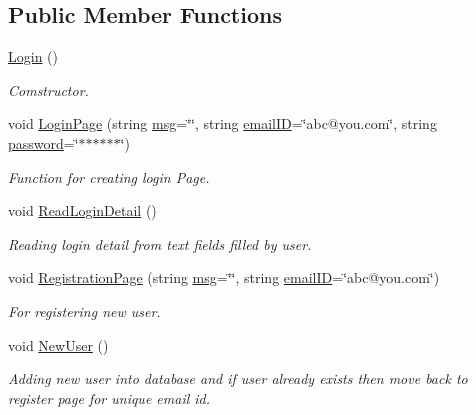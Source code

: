 \subsection*{Public Member Functions}
\begin{DoxyCompactItemize}
\item 
\hyperlink{classLogin_a4847f3e07e43b540d3339392346f87ff}{Login} ()
\begin{DoxyCompactList}\small\item\em Comstructor. \end{DoxyCompactList}\item 
void \hyperlink{classLogin_abcd7a14f9a0d20e55c5fdf71d061b049}{Login\-Page} (string \hyperlink{classInputDetail_a1abb16cd695678c3fa05e3c812823fee}{msg}=\char`\"{}\char`\"{}, string \hyperlink{classLogin_abea56d6d6403f1e627294f222dd77310}{email\-I\-D}=\char`\"{}abc@you.\-com\char`\"{}, string \hyperlink{classLogin_a39f7fd03b2b27c927c657ee73e7fcbbc}{password}=\char`\"{}$\ast$$\ast$$\ast$$\ast$$\ast$$\ast$\char`\"{})
\begin{DoxyCompactList}\small\item\em Function for creating login Page. \end{DoxyCompactList}\item 
void \hyperlink{classLogin_ab5bc65de431f277f15a3b423ad915808}{Read\-Login\-Detail} ()
\begin{DoxyCompactList}\small\item\em Reading login detail from text fields filled by user. \end{DoxyCompactList}\item 
void \hyperlink{classLogin_a3f4e5e4087c007e8e605849778881b39}{Registration\-Page} (string \hyperlink{classInputDetail_a1abb16cd695678c3fa05e3c812823fee}{msg}=\char`\"{}\char`\"{}, string \hyperlink{classLogin_abea56d6d6403f1e627294f222dd77310}{email\-I\-D}=\char`\"{}abc@you.\-com\char`\"{})
\begin{DoxyCompactList}\small\item\em For registering new user. \end{DoxyCompactList}\item 
void \hyperlink{classLogin_ae4f139afcb706f09b337befd123d5e18}{New\-User} ()
\begin{DoxyCompactList}\small\item\em Adding new user into database and if user already exists then move back to register page for unique email id. \end{DoxyCompactList}\item 
$$
\end{DoxyCompactItemize}
